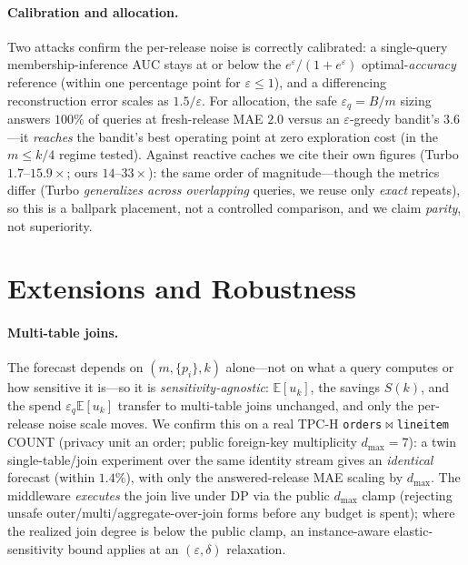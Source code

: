 \documentclass[runningheads]{llncs}
\newcommand{\eps}{\varepsilon}
\newcommand{\E}{\mathbb{E}}
\begin{document}
\paragraph{Calibration and allocation.} Two attacks confirm the per-release noise is correctly calibrated: a single-query membership-inference AUC stays at or below the $e^\eps/(1+e^\eps)$ optimal-\emph{accuracy} reference (within one percentage point for $\eps\le1$), and a differencing reconstruction error scales as $1.5/\eps$. For allocation, the safe $\eps_q{=}B/m$ sizing answers $100\%$ of queries at fresh-release MAE $2.0$ versus an $\eps$-greedy bandit's $3.6$---it \emph{reaches} the bandit's best operating point at zero exploration cost (in the $m\le k/4$ regime tested). Against reactive caches we cite their own figures (Turbo $1.7$--$15.9\times$; ours $14$--$33\times$): the same order of magnitude---though the metrics differ (Turbo \emph{generalizes across overlapping} queries, we reuse only \emph{exact} repeats), so this is a ballpark placement, not a controlled comparison, and we claim \emph{parity}, not superiority.

\section{Extensions and Robustness}
\label{sec:ext}

\paragraph{Multi-table joins.} The forecast depends on $(m,\{p_i\},k)$ alone---not on what a query computes or how sensitive it is---so it is \emph{sensitivity-agnostic}: $\E[u_k]$, the savings $S(k)$, and the spend $\eps_q\E[u_k]$ transfer to multi-table joins unchanged, and only the per-release noise scale moves. We confirm this on a real TPC-H \texttt{orders}$\bowtie$\texttt{lineitem} COUNT (privacy unit an order; public foreign-key multiplicity $d_{\max}{=}7$): a twin single-table/join experiment over the same identity stream gives an \emph{identical} forecast (within $1.4\%$), with only the answered-release MAE scaling by $d_{\max}$. The middleware \emph{executes} the join live under DP via the public $d_{\max}$ clamp (rejecting unsafe outer/multi/aggregate-over-join forms before any budget is spent); where the realized join degree is below the public clamp, an instance-aware elastic-sensitivity bound applies at an $(\eps,\delta)$ relaxation.
\end{document}
